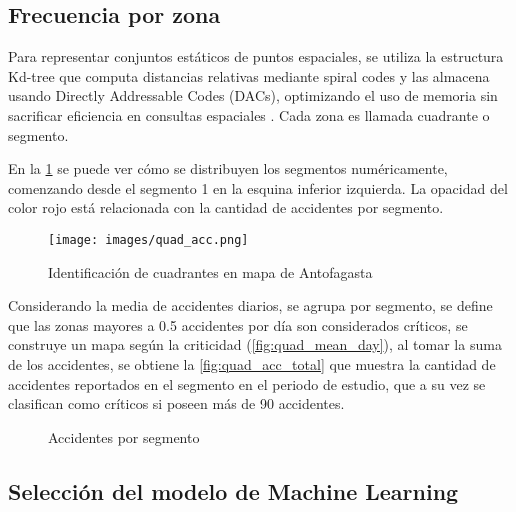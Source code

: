 \documentclass[12pt]{article}
\begin{document}
{%

\subsection{Frecuencia por zona} \label{ssec:freq_zone}

Para representar conjuntos estáticos de puntos espaciales, se utiliza la estructura Kd-tree que computa distancias relativas mediante spiral codes y las almacena usando Directly Addressable Codes (DACs), optimizando el uso de memoria sin sacrificar eficiencia en consultas espaciales \citep{gutierrez2023ckdtree}. Cada zona es llamada cuadrante o segmento.

En la \cref{fig:quad_acc} se puede ver cómo se distribuyen los segmentos numéricamente, comenzando desde el segmento 1 en la esquina inferior izquierda. La opacidad del color rojo está relacionada con la cantidad de accidentes por segmento.

\begin{figure}[H]
    \centering
    \texttt{[image: images/quad\_acc.png]}
    \caption{Identificación de cuadrantes en mapa de Antofagasta}
    \label{fig:quad_acc}
\end{figure}

Considerando la media de accidentes diarios, se agrupa por segmento, se define que las zonas mayores a 0.5 accidentes por día son considerados críticos, se construye un mapa según la criticidad (\cref{fig:quad_mean_day}), al tomar la suma de los accidentes, se obtiene la \cref{fig:quad_acc_total} que muestra la cantidad de accidentes reportados en el segmento en el periodo de estudio, que a su vez se clasifican como críticos si poseen más de 90 accidentes.


\begin{figure}[H]
    \centering
    \caption{Accidentes por segmento}
\end{figure}




\subsection{Selección del modelo de Machine Learning}

}
\end{document}

